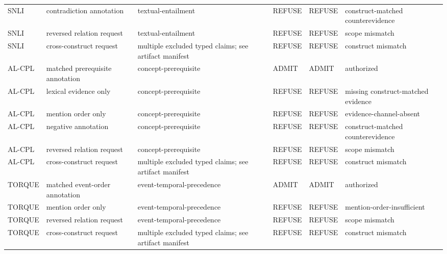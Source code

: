 \begin{table}[t]
\begin{tabular}{@{}p{}p{}p{}p{}p{}p{}@{}}
    SNLI & contradiction annotation & textual-entailment & REFUSE & REFUSE & construct-matched counterevidence \\
    SNLI & reversed relation request & textual-entailment & REFUSE & REFUSE & scope mismatch \\
    SNLI & cross-construct request & multiple excluded typed claims; see artifact manifest & REFUSE & REFUSE & construct mismatch \\
    AL-CPL & matched prerequisite annotation & concept-prerequisite & ADMIT & ADMIT & authorized \\
    AL-CPL & lexical evidence only & concept-prerequisite & REFUSE & REFUSE & missing construct-matched evidence \\
    AL-CPL & mention order only & concept-prerequisite & REFUSE & REFUSE & evidence-channel-absent \\
    AL-CPL & negative annotation & concept-prerequisite & REFUSE & REFUSE & construct-matched counterevidence \\
    AL-CPL & reversed relation request & concept-prerequisite & REFUSE & REFUSE & scope mismatch \\
    AL-CPL & cross-construct request & multiple excluded typed claims; see artifact manifest & REFUSE & REFUSE & construct mismatch \\
    TORQUE & matched event-order annotation & event-temporal-precedence & ADMIT & ADMIT & authorized \\
    TORQUE & mention order only & event-temporal-precedence & REFUSE & REFUSE & mention-order-insufficient \\
    TORQUE & reversed relation request & event-temporal-precedence & REFUSE & REFUSE & scope mismatch \\
    TORQUE & cross-construct request & multiple excluded typed claims; see artifact manifest & REFUSE & REFUSE & construct mismatch \\
    \bottomrule
  \end{tabular}
\end{table}
